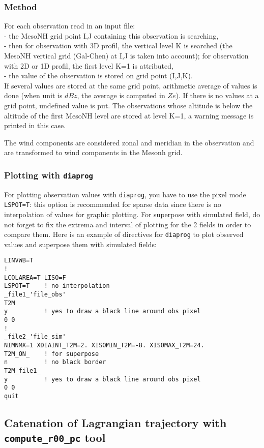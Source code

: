 \subsubsection{Method}
For each observation read in an input file: \\
- the MesoNH grid point I,J containing this observation is searching, \\
- then for observation with 3D profil, the vertical level K is searched
(the MesoNH vertical grid (Gal-Chen) at I,J is taken into account); 
for observation with 2D or 1D profil, the first level K=1 is attributed,\\
- the value of the observation is stored on grid point (I,J,K). \\
If several values are stored at the same grid point, arithmetic average of 
values is done (when unit is $dBz$, the average is computed in $Ze$).
If there is no values at a grid point, undefined value is put. 
The observations whose altitude is below the altitude of the first MesoNH level are stored at level K=1, a warning message is printed in this case.

The wind components are considered zonal and meridian in the observation and
are transformed to wind components in the Mesonh grid.

\subsubsection{Plotting with \texttt{diaprog}}
For plotting observation values with \texttt{diaprog}, you have to use the
pixel mode
\texttt{LSPOT=T}: this option is recommended for sparse data since there is
no interpolation of values for graphic plotting.
For superpose with simulated field, do not forget to fix the extrema
and interval of plotting for the 2 fields in order to compare them.
Here is an example of directives for \texttt{diaprog} to plot observed values
and superpose them with simulated fields:
\begin{verbatim}
LINVWB=T
!
LCOLAREA=T LISO=F 
LSPOT=T    ! no interpolation 
_file1_'file_obs'
T2M
y          ! yes to draw a black line around obs pixel
0 0
!
_file2_'file_sim'
NIMNMX=1 XDIAINT_T2M=2. XISOMIN_T2M=-8. XISOMAX_T2M=24.
T2M_ON_    ! for superpose
n          ! no black border
T2M_file1_
y          ! yes to draw a black line around obs pixel
0 0
quit
\end{verbatim}


\subsection{Catenation of Lagrangian trajectory with
\texttt{compute\_r00\_pc} tool}
